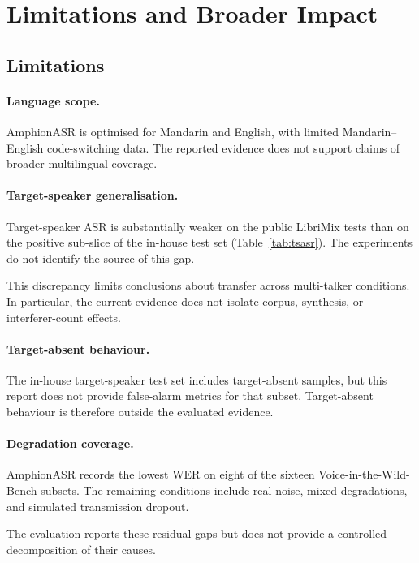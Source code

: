 \section{Limitations and Broader Impact}
\label{sec:limitations}

\subsection{Limitations}

\paragraph{Language scope.}
AmphionASR is optimised for Mandarin and English, with limited
Mandarin--English code-switching data.
The reported evidence does not support claims of broader multilingual
coverage.

\paragraph{Target-speaker generalisation.}
Target-speaker ASR is substantially weaker on the public LibriMix tests
than on the positive sub-slice of the in-house test set
(Table~\ref{tab:tsasr}).
The experiments do not identify the source of this gap.

This discrepancy limits conclusions about transfer across multi-talker
conditions.
In particular, the current evidence does not isolate corpus,
synthesis, or interferer-count effects.

\paragraph{Target-absent behaviour.}
The in-house target-speaker test set includes target-absent samples,
but this report does not provide false-alarm metrics for that subset.
Target-absent behaviour is therefore outside the evaluated evidence.

\paragraph{Degradation coverage.}
AmphionASR records the lowest WER on eight of the sixteen
Voice-in-the-Wild-Bench subsets.
The remaining conditions include real noise, mixed degradations, and
simulated transmission dropout.

The evaluation reports these residual gaps but does not provide a
controlled decomposition of their causes.


